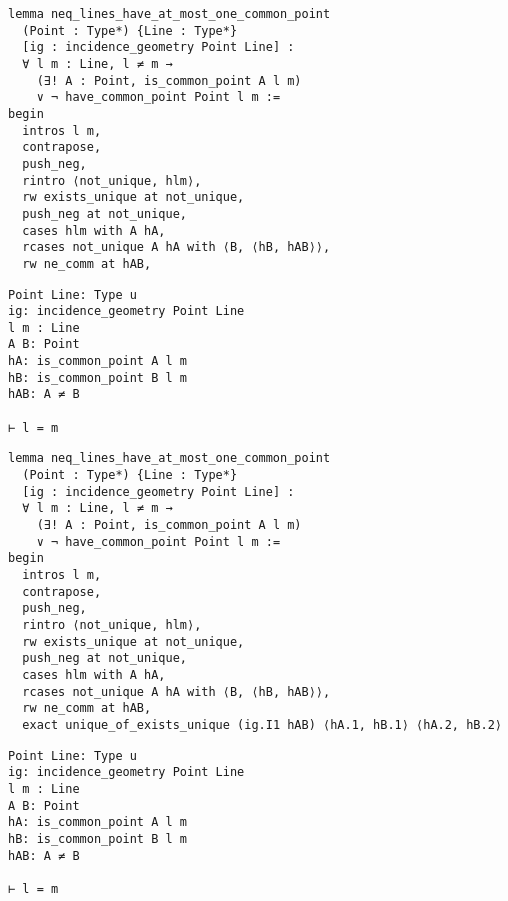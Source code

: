 \begin{frame}[fragile]
	\begin{multicols}{2}
		\begin{lstlisting}
lemma neq_lines_have_at_most_one_common_point 
  (Point : Type*) {Line : Type*} 
  [ig : incidence_geometry Point Line] :
  ∀ l m : Line, l ≠ m → 
    (∃! A : Point, is_common_point A l m) 
    ∨ ¬ have_common_point Point l m := 
begin
  intros l m,
  contrapose,
  push_neg,
  rintro ⟨not_unique, hlm⟩,
  rw exists_unique at not_unique,
  push_neg at not_unique,
  cases hlm with A hA,
  rcases not_unique A hA with ⟨B, ⟨hB, hAB⟩⟩,
  rw ne_comm at hAB,
\end{lstlisting}
		\columnbreak
		\begin{lstlisting}
Point Line: Type u
ig: incidence_geometry Point Line
l m : Line
A B: Point
hA: is_common_point A l m
hB: is_common_point B l m
hAB: A ≠ B

⊢ l = m
\end{lstlisting}
	\end{multicols}
\end{frame}










\begin{frame}[fragile]
	\begin{multicols}{2}
		\begin{lstlisting}
lemma neq_lines_have_at_most_one_common_point 
  (Point : Type*) {Line : Type*} 
  [ig : incidence_geometry Point Line] :
  ∀ l m : Line, l ≠ m → 
    (∃! A : Point, is_common_point A l m) 
    ∨ ¬ have_common_point Point l m := 
begin
  intros l m,
  contrapose,
  push_neg,
  rintro ⟨not_unique, hlm⟩,
  rw exists_unique at not_unique,
  push_neg at not_unique,
  cases hlm with A hA,
  rcases not_unique A hA with ⟨B, ⟨hB, hAB⟩⟩,
  rw ne_comm at hAB,
  exact unique_of_exists_unique (ig.I1 hAB) ⟨hA.1, hB.1⟩ ⟨hA.2, hB.2⟩
\end{lstlisting}
		\columnbreak
		\begin{lstlisting}
Point Line: Type u
ig: incidence_geometry Point Line
l m : Line
A B: Point
hA: is_common_point A l m
hB: is_common_point B l m
hAB: A ≠ B

⊢ l = m
\end{lstlisting}
	\end{multicols}
\end{frame}










